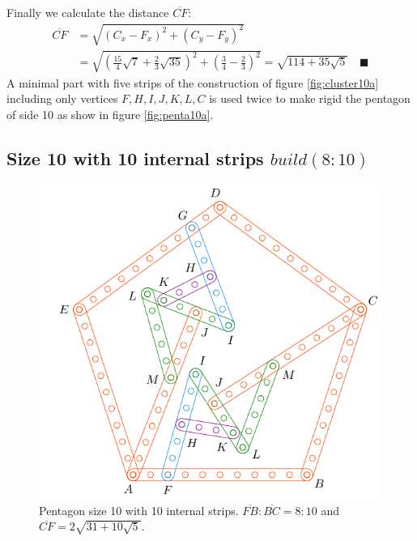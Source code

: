 \documentclass[11pt]{article}
\begin{document}
Finally we calculate the distance $\overline{CF}$:
\begin{align}
\overline{CF} &= \sqrt{(C_x - F_x)^2 + (C_y - F_y)^2}\nonumber\\
 &= \sqrt{\left(\frac{15}{4}\sqrt7 + \frac{2}{3}\sqrt{35}\right)^2
 + \left(\frac{3}4 - \frac{2}3\right)^2} %
 = \sqrt{114+35\sqrt5} \quad\blacksquare
\end{align}
A minimal part with five strips of the construction of figure \ref{fig:cluster10a} including only vertices $F,H,I,J,K,L,C$ is used twice to make rigid the pentagon of side 10 as show in figure \ref{fig:penta10a}.

\subsection{Size 10 with 10 internal strips $build(8:10)$}

\begin{figure}[H]
 \centering
 \includegraphics[scale=0.9]{10/penta10b}
 \caption{Pentagon size 10 with 10 internal strips. $\overline{FB}:\overline{BC} = 8:10$ and $\overline{CF} = 2\sqrt{31 + 10\sqrt5}$.}
 \label{fig:penta10b}
\end{figure}
\end{document}
